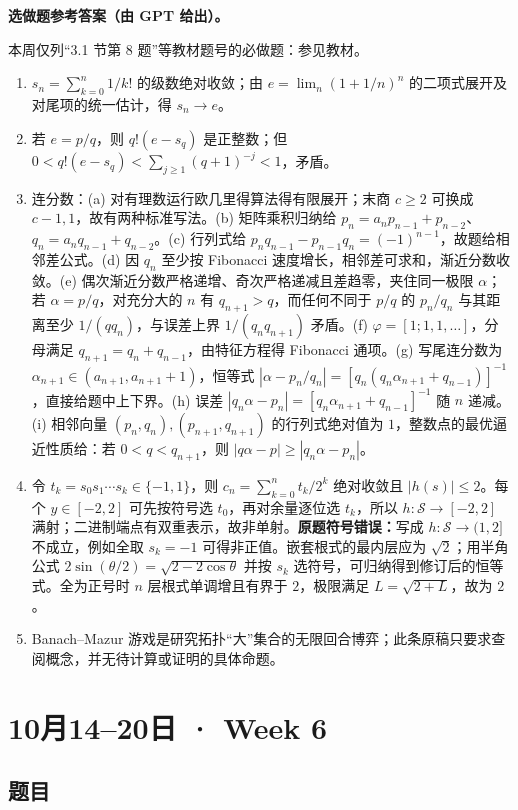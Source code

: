\documentclass[UTF8,11pt, a4paper, oneside, fontset=none]{ctexbook}
\begin{document}
\noindent\textbf{选做题参考答案（由 GPT 给出）。}
\par\noindent 本周仅列“3.1 节第 8 题”等教材题号的必做题：参见教材。
\begin{enumerate}
\item $s_n=\sum_{k=0}^n1/k!$ 的级数绝对收敛；由 $e=\lim_n(1+1/n)^n$ 的二项式展开及对尾项的统一估计，得 $s_n\to e$。
\item 若 $e=p/q$，则 $q!(e-s_q)$ 是正整数；但 $0<q!(e-s_q)<\sum_{j\ge1}(q+1)^{-j}<1$，矛盾。
\item 连分数：(a) 对有理数运行欧几里得算法得有限展开；末商 $c\ge2$ 可换成 $c-1,1$，故有两种标准写法。(b) 矩阵乘积归纳给 $p_n=a_np_{n-1}+p_{n-2}$、$q_n=a_nq_{n-1}+q_{n-2}$。(c) 行列式给 $p_nq_{n-1}-p_{n-1}q_n=(-1)^{n-1}$，故题给相邻差公式。(d) 因 $q_n$ 至少按 Fibonacci 速度增长，相邻差可求和，渐近分数收敛。(e) 偶次渐近分数严格递增、奇次严格递减且差趋零，夹住同一极限 $\alpha$；若 $\alpha=p/q$，对充分大的 $n$ 有 $q_{n+1}>q$，而任何不同于 $p/q$ 的 $p_n/q_n$ 与其距离至少 $1/(qq_n)$，与误差上界 $1/(q_nq_{n+1})$ 矛盾。(f) $\varphi=[1;1,1,\ldots]$，分母满足 $q_{n+1}=q_n+q_{n-1}$，由特征方程得 Fibonacci 通项。(g) 写尾连分数为 $\alpha_{n+1}\in(a_{n+1},a_{n+1}+1)$，恒等式 $|\alpha-p_n/q_n|=[q_n(q_n\alpha_{n+1}+q_{n-1})]^{-1}$，直接给题中上下界。(h) 误差 $|q_n\alpha-p_n|=[q_n\alpha_{n+1}+q_{n-1}]^{-1}$ 随 $n$ 递减。(i) 相邻向量 $(p_n,q_n),(p_{n+1},q_{n+1})$ 的行列式绝对值为 $1$，整数点的最优逼近性质给：若 $0<q<q_{n+1}$，则 $|q\alpha-p|\ge|q_n\alpha-p_n|$。
\item 令 $t_k=s_0s_1\cdots s_k\in\{-1,1\}$，则 $c_n=\sum_{k=0}^nt_k/2^k$ 绝对收敛且 $|h(s)|\le2$。每个 $y\in[-2,2]$ 可先按符号选 $t_0$，再对余量逐位选 $t_k$，所以 $h:\mathcal S\to[-2,2]$ 满射；二进制端点有双重表示，故非单射。\textbf{原题符号错误：}写成 $h:\mathcal S\to(1,2]$ 不成立，例如全取 $s_k=-1$ 可得非正值。嵌套根式的最内层应为 $\sqrt2$；用半角公式 $2\sin(\theta/2)=\sqrt{2-2\cos\theta}$ 并按 $s_k$ 选符号，可归纳得到修订后的恒等式。全为正号时 $n$ 层根式单调增且有界于 $2$，极限满足 $L=\sqrt{2+L}$，故为 $2$。
\item Banach--Mazur 游戏是研究拓扑“大”集合的无限回合博弈；此条原稿只要求查阅概念，并无待计算或证明的具体命题。
\end{enumerate}

\clearpage

\section{10月14--20日 · Week 6}

\subsection*{题目}
\end{document}
